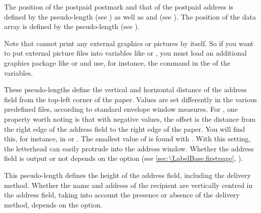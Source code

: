 The position of the postpaid postmark and that of the
postpaid address is defined by the  pseudo-length (see
) as well as
 and  (see
). The position of
the data array is defined by the  pseudo-length 
(see ).

Note that \KOMAScript{} cannot print any external
graphics or pictures by itself. So if you want to put external picture files
into variables like  or , you
must load an additional graphics package like
 or
 and use, for instance, the
 command in the  of the variables.%
%
\EndIndexGroup


\begin{Declaration}
\end{Declaration}
These pseudo-lengths define the vertical and horizontal distance of the
address field from the top-left corner of the paper. Values are set
differently in the various predefined  files, according to standard envelope window
measures. For , one property worth noting is that with
negative values, the offset is the distance from the right edge of the address
field to the right edge of the paper. You will find this, for instance, in
 or . The smallest value of  is
found with . With this setting, the letterhead can easily
protrude into the address window. Whether the address field is output or not
depends on the  option (see
\autoref{sec:\LabelBase.firstpage}, ).%
\EndIndexGroup


\begin{Declaration}
\end{Declaration}
This pseudo-length defines the height of the address field, including the
delivery method. Whether the name and address of the recipient are vertically
centred in the address field, taking into account the presence or absence of
the delivery method, depends on the 
option.%
\EndIndexGroup
 


